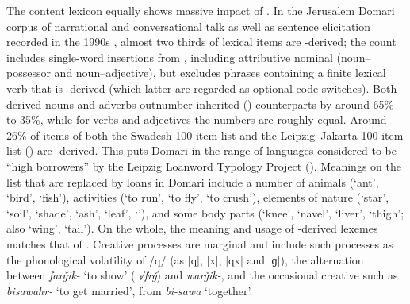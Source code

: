 \documentclass[output=paper]{langsci/langscibook}
\begin{document}
The content lexicon equally shows massive impact of . In the Jerusalem Domari corpus of narrational and conversational talk as well as sentence elicitation recorded in the 1990s \citep{Matras2012}, almost two thirds of lexical items are -derived; the count includes single-word insertions from , including attributive nominal  (noun–possessor and noun–adjective), but excludes phrases containing a finite lexical verb that is -derived (which latter are regarded as optional code-switches). Both -derived nouns and adverbs outnumber inherited () counterparts by around 65\% to 35\%, while for verbs and adjectives the numbers are roughly equal. Around 26\% of items of both the Swadesh 100-item list and the Leipzig–Jakarta 100-item list (\citealt{HaspelmathTadmor2009}) are -derived. This puts Domari in the range of languages considered to be ``high borrowers'' by the Leipzig Loanword Typology Project (\citealt{HaspelmathTadmor2009}). Meanings on the list that are replaced by  loans in Domari include a number of animals (‘ant’, ‘bird’, ‘fish’), activities (‘to run’, ‘to fly’, ‘to crush’), elements of nature (‘star’, ‘soil’, ‘shade’, ‘ash’, ‘leaf’, ‘’), and some body parts (‘knee’, ‘navel’, ‘liver’, ‘thigh’; also ‘wing’, ‘tail’). On the whole, the meaning and usage of -derived lexemes matches that of  . Creative processes are marginal and include such processes as the phonological volatility of /q/ (as [q], [x], [qx] and [ɡ]), the alternation between \textit{farǧik-} ‘to show’ ( \textit{√frǧ}) and \textit{warǧik-}, and the occasional creative  such as \textit{bisawahr-} ‘to get married’, from  \textit{bi-sawa} ‘together’. 
\end{document}
